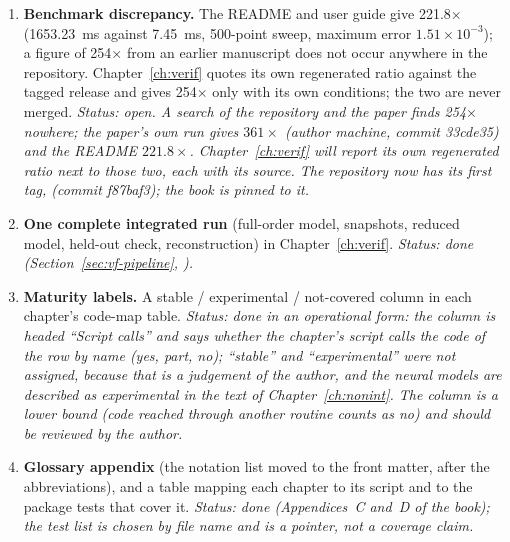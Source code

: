 \begin{enumerate}
\item \textbf{Benchmark discrepancy.} The README and user guide give 221.8$\times$ (1653.23~ms against 7.45~ms, 500-point sweep, maximum error $1.51\times10^{-3}$); a figure of 254$\times$ from an earlier manuscript does not occur anywhere in the repository. Chapter~\ref{ch:verif} quotes its own regenerated ratio against the tagged release and gives 254$\times$ only with its own conditions; the two are never merged. \emph{Status: open. A search of the repository and the paper finds 254$\times$ nowhere; the paper's own run gives $361\times$ (author machine, commit 33cde35) and the README $221.8\times$. Chapter~\ref{ch:verif} will report its own regenerated ratio next to those two, each with its source. The repository now has its first tag,  (commit f87baf3); the book is pinned to it.}
\item \textbf{One complete integrated run} (full-order model, snapshots, reduced model, held-out check, reconstruction) in Chapter~\ref{ch:verif}. \emph{Status: done (Section~\ref{sec:vf-pipeline}, ).}
\item \textbf{Maturity labels.} A stable / experimental / not-covered column in each chapter's code-map table. \emph{Status: done in an operational form: the column is headed ``Script calls'' and says whether the chapter's script calls the code of the row by name (yes, part, no); ``stable'' and ``experimental'' were not assigned, because that is a judgement of the author, and the neural models are described as experimental in the text of Chapter~\ref{ch:nonint}. The column is a lower bound (code reached through another routine counts as no) and should be reviewed by the author.}
\item \textbf{Glossary appendix} (the notation list moved to the front matter, after the abbreviations), and a table mapping each chapter to its script and to the package tests that cover it. \emph{Status: done (Appendices~C and~D of the book); the test list is chosen by file name and is a pointer, not a coverage claim.}
\end{enumerate}
